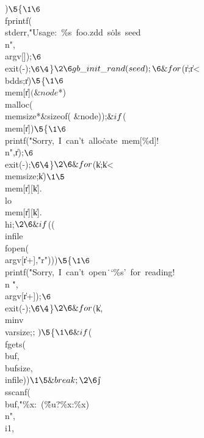 ){}$\5
${}\{{}$\1\6
${}\\{fprintf}(\\{stderr},\.{"Usage:\ \%s\ foo.zdd\ s}\)\.{ols\ seed\\n"},%
\\{argv}[]);{}$\6
${}\\{exit}({-});{}$\6
\4${}\}{}$\2\6
\\{gb\_init\_rand}(\\{seed});\6
\&{for} ${}(\|r\K{};{}$ ${}\|r<\\{bdds};{}$ ${}\|r\PP){}$\5
${}\{{}$\1\6
${}\\{mem}[\|r]\K{}$(\&{node} ${}{*})\,\\{malloc}(\\{memsize}*\&{sizeof}(%
\&{node}));{}$\6
\&{if} ${}(\R\\{mem}[\|r]){}$\5
${}\{{}$\1\6
${}\\{printf}(\.{"Sorry,\ I\ can't\ allo}\)\.{cate\ mem[\%d]!\\n"},\|r);{}$\6
${}\\{exit}({-});{}$\6
\4${}\}{}$\2\6
\&{for} ${}(\|k\K{};{}$ ${}\|k<\\{memsize};{}$ ${}\|k\PP){}$\1\5
${}\\{mem}[\|r][\|k].\\{lo}\K\\{mem}[\|r][\|k].\\{hi}\K{};{}$\2\6
\&{if} ${}(\R(\\{infile}\K\\{fopen}(\\{argv}[\|r+],\.{"r"}))){}$\5
${}\{{}$\1\6
${}\\{printf}(\.{"Sorry,\ I\ can't\ open}\)\.{\ `\%s'\ for\ reading!\\n}\)%
\.{"},\\{argv}[\|r+]);{}$\6
${}\\{exit}({-});{}$\6
\4${}\}{}$\2\6
\&{for} ${}(\|k\K{},\\{minv}\K\\{varsize};{}$  ; \,)\5
${}\{{}$\1\6
\&{if} ${}(\R\\{fgets}(\\{buf},\\{bufsize},\\{infile})){}$\1\5
\&{break};\2\6
${}\|j\K\\{sscanf}(\\{buf},\.{"\%x:\ (\~\%u?\%x:\%x)\\n"},\\{i1},%
